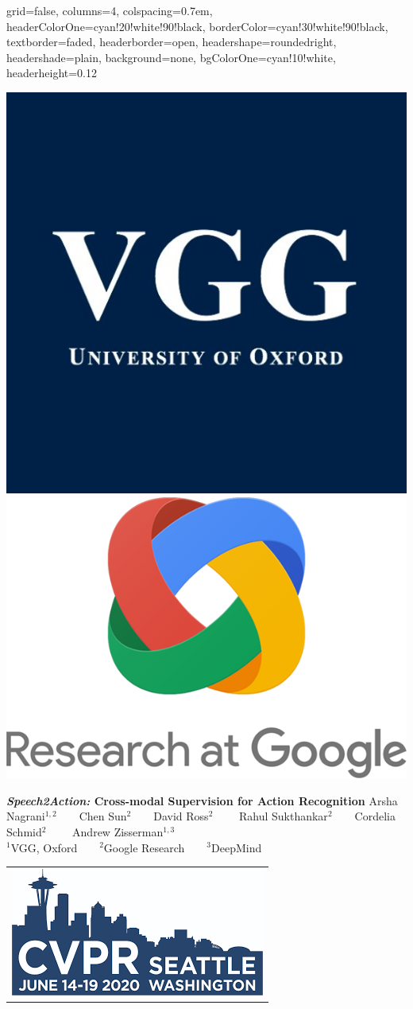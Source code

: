 \documentclass[landscape,a0paper,fontscale=0.292]{baposter}
\begin{document}
\begin{poster}{
 grid=false,
 columns=4,
 colspacing=0.7em,
 headerColorOne=cyan!20!white!90!black,
 borderColor=cyan!30!white!90!black,
 textborder=faded,
 headerborder=open,
 headershape=roundedright,
 headershade=plain,
 background=none,
 bgColorOne=cyan!10!white,
 headerheight=0.12\textheight}
 {
      \includegraphics[width=0.07\linewidth]{VGG_logo.jpg}
      \makebox[0.005\textwidth]{} 
      \includegraphics[width=0.08\linewidth]{Google_Research.png}
      
    
 }
 {\sc\huge\bf \textit{Speech2Action:} Cross-modal Supervision for Action Recognition}
 {Arsha Nagrani$^{1,2}$~~~~Chen Sun$^2$~~~~David Ross$^2$ ~~~~Rahul Sukthankar$^2$~~~~Cordelia Schmid$^{2}$ ~~~~Andrew Zisserman$^{1,3}$ \\[0.2em]

$^1$VGG, Oxford~~~~$^2$Google Research~~~~$^3$DeepMind~~~~  }
 {
  \begin{tabular}{r}
    \includegraphics[width=0.12\linewidth]{CVPR_logo_2020.png}
  \end{tabular}
 }



\end{poster}
\end{document}
